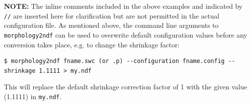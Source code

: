 \documentclass[12pt]{article}
\begin{document}
{\bf NOTE:} The inline comments included in the above examples and
indicated by {\tt //} are inserted here for clarification but are not
permitted in the actual configuration file. As mentioned above, the
command line arguments to {\tt morphology2ndf} can be used to
overwrite default configuration values before any conversion takes
place, e.g. to change the shrinkage factor:

\begin{verbatim}
$ morphology2ndf fname.swc (or .p) --configuration fname.config --shrinkage 1.1111 > my.ndf
\end{verbatim}

This will replace the default shrinkage correction factor of 1 with
the given value (1.1111) in {\tt my.ndf}.











\end{document}
